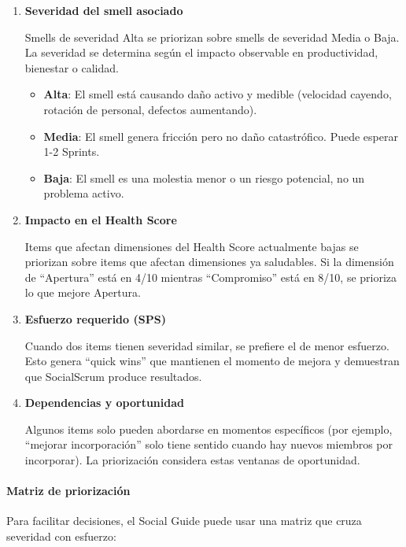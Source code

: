 \begin{enumerate}
    \item \textbf{Severidad del smell asociado}

          Smells de severidad Alta se priorizan sobre smells de severidad Media o Baja. La severidad se determina según el impacto observable en productividad, bienestar o calidad.

          \begin{itemize}
              \item \textbf{Alta}: El smell está causando daño activo y medible (velocidad cayendo, rotación de personal, defectos aumentando).
              \item \textbf{Media}: El smell genera fricción pero no daño catastrófico. Puede esperar 1-2 Sprints.
              \item \textbf{Baja}: El smell es una molestia menor o un riesgo potencial, no un problema activo.
          \end{itemize}

    \item \textbf{Impacto en el Health Score}

          Items que afectan dimensiones del Health Score actualmente bajas se priorizan sobre items que afectan dimensiones ya saludables. Si la dimensión de ``Apertura'' está en 4/10 mientras ``Compromiso'' está en 8/10, se prioriza lo que mejore Apertura.

    \item \textbf{Esfuerzo requerido (SPS)}

          Cuando dos items tienen severidad similar, se prefiere el de menor esfuerzo. Esto genera ``quick wins'' que mantienen el momento de mejora y demuestran que SocialScrum produce resultados.

    \item \textbf{Dependencias y oportunidad}

          Algunos items solo pueden abordarse en momentos específicos (por ejemplo, ``mejorar incorporación'' solo tiene sentido cuando hay nuevos miembros por incorporar). La priorización considera estas ventanas de oportunidad.
\end{enumerate}

\paragraph{Matriz de priorización}

Para facilitar decisiones, el Social Guide puede usar una matriz que cruza severidad con esfuerzo:


